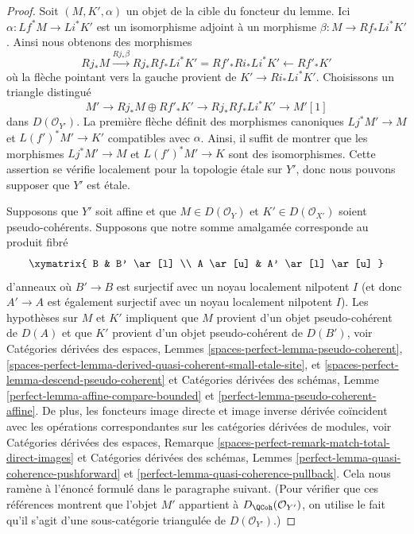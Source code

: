\begin{proof}
Soit $(M, K', \alpha)$ un objet de la cible du foncteur
du lemme. Ici $\alpha : Lf^*M \to Li^*K'$
est un isomorphisme adjoint à un morphisme $\beta : M \to Rf_*Li^*K'$.
Ainsi nous obtenons des morphismes
$$
Rj_*M \xrightarrow{Rj_*\beta}
Rj_*Rf_*Li^*K' = Rf'_*Ri_*Li^*K' \leftarrow Rf'_*K'
$$
où la flèche pointant vers la gauche provient de $K' \to Ri_*Li^*K'$.
Choisissons un triangle distingué
$$
M' \to Rj_*M \oplus Rf'_*K' \to Rj_*Rf_*Li^*K' \to M'[1]
$$
dans $D(\mathcal{O}_{Y'})$. La première flèche définit des morphismes canoniques
$Lj^*M' \to M$ et $L(f')^*M' \to K'$ compatibles avec $\alpha$.
Ainsi, il suffit de montrer que les morphismes
$Lj^*M' \to M$ et $L(f')^*M' \to K$ sont des isomorphismes.
Cette assertion se vérifie localement pour la topologie \'etale sur $Y'$, donc nous pouvons
supposer que $Y'$ est \'etale.

\medskip\noindent
Supposons que $Y'$ soit affine et que $M \in D(\mathcal{O}_Y)$
et $K' \in D(\mathcal{O}_{X'})$ soient pseudo-cohérents.
Supposons que notre somme amalgamée corresponde au produit fibré
$$
\xymatrix{
B & B' \ar[l] \\
A \ar[u] & A' \ar[l] \ar[u]
}
$$
d'anneaux où $B' \to B$ est surjectif avec un noyau localement nilpotent $I$
(et donc $A' \to A$ est également surjectif avec un noyau localement nilpotent $I$).
Les hypothèses sur $M$ et $K'$ impliquent que $M$ provient d'un objet pseudo-cohérent de $D(A)$ et que $K'$ provient d'un objet pseudo-cohérent de $D(B')$, voir
Catégories dérivées des espaces, Lemmes
\ref{spaces-perfect-lemma-pseudo-coherent},
\ref{spaces-perfect-lemma-derived-quasi-coherent-small-etale-site}, et
\ref{spaces-perfect-lemma-descend-pseudo-coherent}
et
Catégories dérivées des schémas, Lemme
\ref{perfect-lemma-affine-compare-bounded} et
\ref{perfect-lemma-pseudo-coherent-affine}.
De plus, les foncteurs image directe et image inverse dérivée coïncident avec les
opérations correspondantes sur les catégories dérivées de modules, voir Catégories dérivées des espaces, Remarque
\ref{spaces-perfect-remark-match-total-direct-images}
et
Catégories dérivées des schémas, Lemmes
\ref{perfect-lemma-quasi-coherence-pushforward} et
\ref{perfect-lemma-quasi-coherence-pullback}.
Cela nous ramène à l'énoncé formulé dans le paragraphe suivant.
(Pour vérifier que ces références montrent que l'objet $M'$ appartient à
$D_\QCoh(\mathcal{O}_{Y'})$, on utilise le fait qu'il s'agit d'une
sous-catégorie triangulée de $D(\mathcal{O}_{Y'})$.)


\end{proof}
